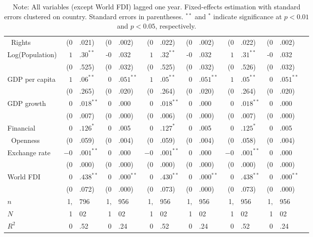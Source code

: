 \documentclass[12pt,onesided]{amsart}
\begin{document}
\begin{table}[ht]
{\begin{tabular}{lr@{} lr@{}lr@{}lr@{}lr@{}lr@{}lr@{} }
	$\;\;$Rights & (0&.021) & (0&.002) & (0&.022) & (0&.002) & (0&.022) & (0&.002) \\
	\multirow{2}{*}{Log(Population)} & $1$&$.30^{\ast\ast}$ & -0&.032 & $1$&$.32^{\ast\ast}$ & -0&.032 & $1$&$.31^{\ast\ast}$ & -0&.032 \\
	& (0&.525) & (0&.032) & (0&.525) & (0&.032) & (0&.526) & (0&.032) \\
	\multirow{2}{*}{GDP per capita} & $1$&$.06^{\ast\ast}$ & $0$&$.051^{\ast\ast}$ & $1$&$.05^{\ast\ast}$ & $0$&$.051^{\ast\ast}$ & $1$&$.05^{\ast\ast}$ & $0$&$.051^{\ast\ast}$ \\
	& (0&.265) & (0&.020) & (0&.264) & (0&.020) & (0&.264) & (0&.020) \\
	\multirow{2}{*}{GDP growth} & $0$&$.018^{\ast\ast}$ & 0&.000 & $0$&$.018^{\ast\ast}$ & 0&.000 & $0$&$.018^{\ast\ast}$ & 0&.000 \\
	& (0&.007) & (0&.000) & (0&.006) & (0&.000) & (0&.007) &(0&.000) \\
	Financial & $0$&$.126^{\ast}$ & 0&.005 & $0$&$.127^{\ast}$ & 0&.005 & $0$&$.125^{\ast}$ & 0&.005 \\
	$\;\;$Openness & (0&.059) & (0&.004) & (0&.059) & (0&.004) & (0&.058) &(0&.004) \\
	\multirow{2}{*}{Exchange rate} & $-0$&$.001^{\ast\ast}$ & 0&.000 & $-0$&$.001^{\ast\ast}$ & 0&.000 & $-0$&$.001^{\ast\ast}$ & 0&.000 \\
	& (0&.000) & (0&.000) & (0&.000) & (0&.000) & (0&.000) &(0&.000) \\	
	\multirow{2}{*}{World FDI} & $0$&$.438^{\ast\ast}$ & $0$&$.000^{\ast\ast}$ & $0$&$.430^{\ast\ast}$ & $0$&$.000^{\ast\ast}$ & $0$&$.438^{\ast\ast}$ & $0$&$.000^{\ast\ast}$ \\
	& (0&.072) & (0&.000) & (0&.073) & (0&.000) & (0&.073) &(0&.000) \\ \hline
	$n$ & 1,&796 & 1,&956 & 1,&956 & 1,&956 & 1,&956 & 1,&956 \\
	$N$ & 1&02 & 1&02 & 1&02 & 1&02 & 1&02 & 1&02 \\
	$R^{2}$ & 0&.52 & 0&.24 & 0&.52 & 0&.24 & 0&.52 & 0&.24 \\
	\hline\hline
\end{tabular}
\caption*{Note: All variables (except World FDI) lagged one year. Fixed-effects estimation with standard errors clustered on country. Standard errors in parentheses. $^{**}$ and $^{*}$ indicate significance at $p<0.01$ and $p<0.05$, respectively.}
}
\end{table}
\end{document}
